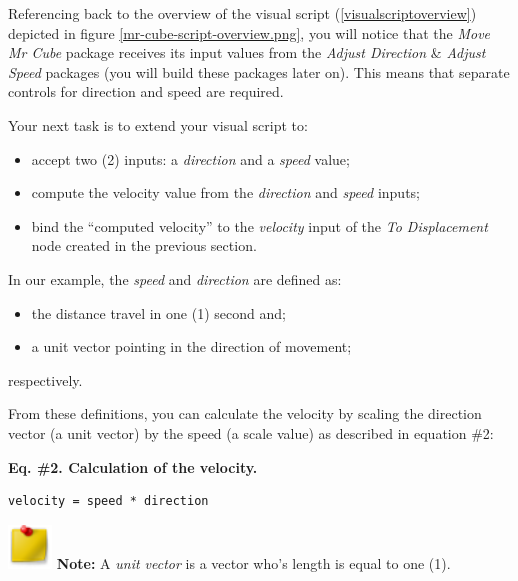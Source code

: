 Referencing back to the overview of the visual script (\autoref{visualscriptoverview}) depicted in figure \ref{mr-cube-script-overview.png}, you will notice that the \emph{Move Mr Cube} package receives its input values from the \emph{Adjust Direction} \& \emph{Adjust Speed} packages (you will build these packages later on). This means that separate controls for direction and speed are required.

Your next task is to extend your visual script to:

\begin{itemize}
\item accept two (2) inputs: a \emph{direction} and a \emph{speed} value;

\item compute the velocity value from the \emph{direction} and \emph{speed} inputs;

\item bind the ``computed velocity'' to the \emph{velocity} input of the \emph{To Displacement} node created in the previous section.

\end{itemize}

In our example, the \emph{speed} and \emph{direction} are defined as:

\begin{itemize}
\item the distance travel in one (1) second and;

\item a unit vector pointing in the direction of movement;

\end{itemize}

respectively.

From these definitions, you can calculate the velocity by scaling the direction vector (a unit vector) by the speed (a scale value) as described in equation \#2:
\begin{tipbox}

\textbf{Eq. \#2. Calculation of the velocity.}

\begin{verbatim}
velocity = speed * direction
\end{verbatim}

\end{tipbox}


\begin{tipbox}

\includegraphics[width=33pt,height=33pt]{PostitNote_32x32.png} \textbf{Note:} A \emph{unit vector} is a vector who's length is equal to one (1).

\end{tipbox}



